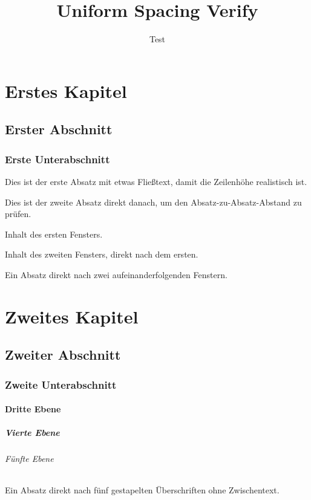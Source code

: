 \documentclass[type=report,theme=light,language=de]{semio}
\title{Uniform Spacing Verify}
\author{Test}
\begin{document}
\chapter{Erstes Kapitel}
\section{Erster Abschnitt}
\subsection{Erste Unterabschnitt}

Dies ist der erste Absatz mit etwas Flie\ss text, damit die Zeilenh\"ohe realistisch ist.

Dies ist der zweite Absatz direkt danach, um den Absatz-zu-Absatz-Abstand zu pr\"ufen.

\begin{Figure}[title=Erstes Fenster]
  Inhalt des ersten Fensters.
\end{Figure}

\begin{Figure}[title=Zweites Fenster]
  Inhalt des zweiten Fensters, direkt nach dem ersten.
\end{Figure}

Ein Absatz direkt nach zwei aufeinanderfolgenden Fenstern.

\chapter{Zweites Kapitel}
\section{Zweiter Abschnitt}
\subsection{Zweite Unterabschnitt}
\subsubsection{Dritte Ebene}
\paragraph{Vierte Ebene}
\subparagraph{F\"unfte Ebene}

Ein Absatz direkt nach f\"unf gestapelten \"Uberschriften ohne Zwischentext.

\begin{Table}[title=Testtabelle]
\end{Table}
\end{document}
